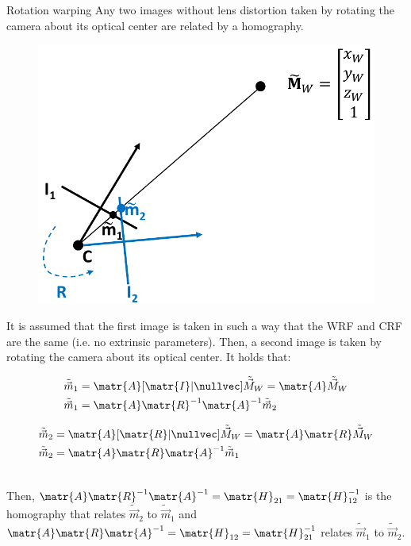 \begin{descriptionlist}
    \item[Rotation warping] 
        Any two images without lens distortion taken by rotating the camera about its optical center are related by a homography.
        \begin{figure}[H]
            \centering
            \includegraphics[width=0.35\linewidth]{./img/_warp_application2.pdf}
        \end{figure}
        It is assumed that the first image is taken in such a way that the WRF and CRF are the same (i.e. no extrinsic parameters).
        Then, a second image is taken by rotating the camera about its optical center.
        It holds that:\\[-0.5em]
        \begin{minipage}{0.5\linewidth}            
            \[
                \begin{split}
                    \tilde{\vec{m}}_1 &= \matr{A} [\matr{I} | \nullvec] \tilde{\vec{M}}_W = \matr{A}\tilde{\vec{M}}_W \\
                    \tilde{\vec{m}}_1 &= \matr{A}\matr{R}^{-1}\matr{A}^{-1} \tilde{\vec{m}}_2 \\
                \end{split}
            \]
        \end{minipage}
        \begin{minipage}{0.5\linewidth}            
            \[
                \begin{split}
                    \tilde{\vec{m}}_2 &= \matr{A} [\matr{R} | \nullvec] \tilde{\vec{M}}_W = \matr{A}\matr{R}\tilde{\vec{M}}_W \\
                    \tilde{\vec{m}}_2 &= \matr{A}\matr{R}\matr{A}^{-1} \tilde{\vec{m}}_1 \\
                \end{split}
            \]
        \end{minipage}\\[0.5em]
        Then, $\matr{A}\matr{R}^{-1}\matr{A}^{-1} = \matr{H}_{21} = \matr{H}_{12}^{-1}$ is the homography that relates $\tilde{\vec{m}}_2$ to $\tilde{\vec{m}}_1$
        and $\matr{A}\matr{R}\matr{A}^{-1} = \matr{H}_{12} = \matr{H}_{21}^{-1}$ relates $\tilde{\vec{m}}_1$ to $\tilde{\vec{m}}_2$.


\end{descriptionlist}
